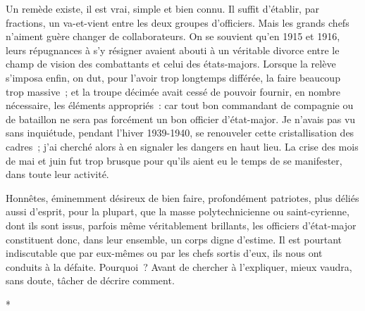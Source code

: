 \documentclass[french,twoside]{book} %
\begin{document}
Un remède existe, il est vrai, simple et bien connu. Il suffit d’établir, par fractions, un va-et-vient entre les deux groupes d’officiers. Mais les grands chefs n’aiment guère changer de collaborateurs. On se souvient qu’en 1915 et 1916, leurs répugnances à s’y résigner avaient abouti à un véritable divorce entre   le champ de vision des combattants et celui des états-majors. Lorsque la relève s’imposa enfin, on dut, pour l’avoir trop longtemps différée, la faire beaucoup trop massive ; et la troupe décimée avait cessé de pouvoir fournir, en nombre nécessaire, les éléments appropriés : car tout bon commandant de compagnie ou de bataillon ne sera pas forcément un bon officier d’état-major. Je n’avais pas vu sans inquiétude, pendant l’hiver 1939-1940, se renouveler cette cristallisation des cadres ; j’ai cherché alors à en signaler les dangers en haut lieu. La crise des mois de mai et juin fut trop brusque pour qu’ils aient eu le temps de se manifester, dans toute leur activité.\par
Honnêtes, éminemment désireux de bien faire, profondément patriotes, plus déliés aussi d’esprit, pour la plupart, que la masse polytechnicienne ou saint-cyrienne, dont ils sont issus, parfois même véritablement brillants, les officiers d’état-major constituent donc, dans leur ensemble, un corps digne d’estime. Il est pourtant indiscutable que par eux-mêmes ou par les chefs sortis d’eux, ils nous ont conduits à la défaite. Pourquoi ? Avant de chercher à l’expliquer, mieux vaudra, sans doute, tâcher de décrire comment.\par

\begin{center}
\noindent \centerline{*}\par
\end{center}
\end{document}
